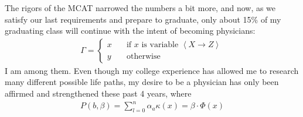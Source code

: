 \documentclass[manuscript]{clv2025}
\begin{document}
The rigors of the MCAT narrowed the numbers a bit more, and now, as we satisfy our last requirements and prepare to graduate, only about 15\% of my graduating class will continue with the intent of becoming physicians:
\begin{align}
\Gamma=\left\{
\begin{array}{ll}
x&\quad \text{if $x$ is variable $\left<X\rightarrow Z\right>$}\\
y&\quad \text{otherwise}
\end{array}
\right.
\nonumber
\end{align}
I am among them. Even though my college experience has allowed me to research many different possible life paths, my desire to be a physician has only been affirmed and strengthened these past 4 years, where
\begin{align}
P(b,\beta)
=\sum_{l=0}^n \alpha_a \kappa(x) = \beta\cdot \Phi(x)
\end{align}
\end{document}

